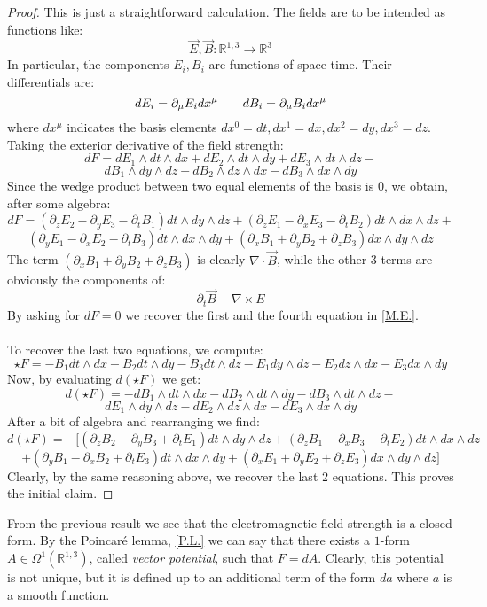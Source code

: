 \documentclass[12pt,a4paper]{report}
\theoremstyle{definition}
\theoremstyle{Theorem}
\theoremstyle{definition}
\theoremstyle{definition}
\begin{document}
	\begin{proof}
		This is just a straightforward calculation. The fields are to be intended as functions like:
		$$\vec{E},\vec{B}:\mathbb{R}^{1,3}\rightarrow\mathbb{R}^3$$
		In particular, the components $E_i,B_i$ are functions of space-time. Their differentials are:
		$$dE_i=\partial_\mu E_idx^\mu\hspace{20 pt}dB_i=\partial_\mu B_idx^\mu$$
		where $dx^\mu$ indicates the basis elements $dx^0=dt,dx^1=dx,dx^2=dy,dx^3=dz$. Taking the exterior derivative of the field strength:
		$$dF=dE_1\wedge dt\wedge dx+dE_2\wedge dt\wedge dy+dE_3\wedge dt\wedge dz-$$
		$$dB_1\wedge dy\wedge dz-dB_2\wedge dz\wedge dx-dB_3\wedge dx\wedge dy$$
		Since the wedge product between two equal elements of the basis is 0, we obtain, after some algebra:
		$$dF=(\partial_z E_2-\partial_y E_3-\partial_t B_1)dt\wedge dy\wedge dz+(\partial_z E_1-\partial_x E_3-\partial_t B_2)dt\wedge dx\wedge dz+$$
		$$(\partial_y E_1-\partial_x E_2-\partial_t B_3)dt\wedge dx\wedge dy+ (\partial_x B_1+ \partial_y B_2+\partial_z B_3)dx\wedge dy\wedge dz$$
		The term $(\partial_x B_1+ \partial_y B_2+\partial_z B_3)$ is clearly $\nabla\cdot \vec{B}$, while the other 3 terms are obviously the components of:
		$$\partial_t\vec{B}+\nabla\times E$$
		By asking for $dF=0$ we recover the first and the fourth equation in \ref*{M.E.}.\\
		\\
		To recover the last two equations, we compute: 
		$$\star F=-B_1 dt\wedge dx-B_2dt\wedge dy-B_3 dt\wedge dz-E_1 dy\wedge dz-E_2 dz\wedge dx-E_3 dx\wedge dy$$
		Now, by evaluating $d(\star F)$ we get:
		$$d(\star F)=-dB_1\wedge dt\wedge dx-dB_2\wedge dt\wedge dy-dB_3\wedge dt\wedge dz-$$
		$$dE_1\wedge dy\wedge dz-dE_2\wedge dz\wedge dx-dE_3\wedge dx\wedge dy$$
		After a bit of algebra and rearranging we find:
		$$d(\star F)=-\bigg[(\partial_z B_2-\partial_y B_3+\partial_t E_1)dt\wedge dy\wedge dz+
		(\partial_z B_1-\partial_x B_3-\partial_t E_2)dt\wedge dx\wedge dz
		$$
		$$+(\partial_y B_1-\partial_x B_2+\partial_t E_3)dt\wedge dx\wedge dy+(\partial_x E_1+\partial_y E_2+\partial_z E_3)dx\wedge dy\wedge dz\bigg]$$
		Clearly, by the same reasoning above, we recover the last 2 equations. This proves the initial claim.
	\end{proof}
	From the previous result we see that the electromagnetic field strength is a closed form. By the Poincaré lemma, \ref{P.L.} we can say that there exists a $1$-form $A\in\Omega^1(\mathbb{R}^{1,3})$, called \textit{vector potential}, such that $F=dA$. Clearly, this potential is not unique, but it is defined up to an additional term of the form $da$ where $a$ is a smooth function.\\
\end{document}
